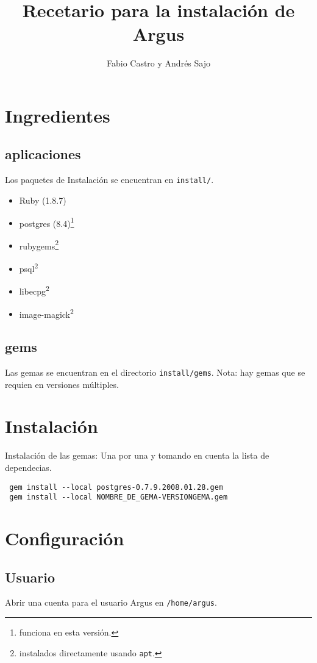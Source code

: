 \documentclass[spanish,10pt]{article}
\title{Recetario para la instalación de Argus}
\author{Fabio Castro y Andrés Sajo}
\begin{document}
\maketitle
\section{Ingredientes}
\subsection{aplicaciones}
Los paquetes de Instalación se encuentran en \texttt{install/}.
\begin{itemize}
\item[]  Ruby (1.8.7)
\item[] postgres (8.4)\footnote{funciona en esta versión.} 
\item[] rubygems\footnote[2]{instalados directamente usando \texttt{apt}.}
\item[] psql\textsuperscript{2}
\item[] libecpg\textsuperscript{2}
\item[] image-magick\textsuperscript{2}
\end{itemize}
\subsection{gems}
Las gemas se encuentran en el directorio \texttt{install/gems}. Nota: hay gemas que se requien en versiones múltiples.

\section{Instalación}
Instalación de las gemas: Una por una y tomando en cuenta la lista de dependecias.
\begin{verbatim}
 gem install --local postgres-0.7.9.2008.01.28.gem
 gem install --local NOMBRE_DE_GEMA-VERSIONGEMA.gem
\end{verbatim}

\section{Configuración}
\subsection{Usuario}
Abrir una cuenta para el usuario Argus en \texttt{/home/argus}.
\end{document}
